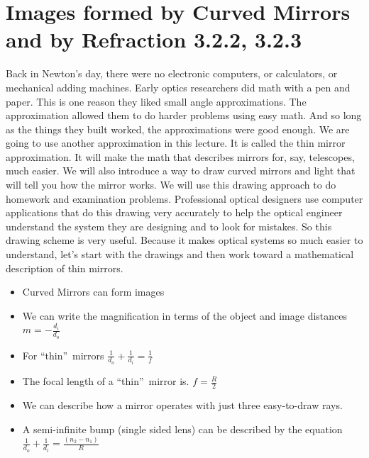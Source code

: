 \documentclass{article}
\begin{document}
\section{Images formed by Curved Mirrors and by Refraction 3.2.2, 3.2.3}

Back in Newton's day, there were no electronic computers, or calculators, or
mechanical adding machines. Early optics researchers did math with a pen and
paper. This is one reason they liked small angle approximations. The
approximation allowed them to do harder problems using easy math. And so
long as the things they built worked, the approximations were good enough.
We are going to use another approximation in this lecture. It is called the
thin mirror approximation. It will make the math that describes mirrors for,
say, telescopes, much easier. We will also introduce a way to draw curved
mirrors and light that will tell you how the mirror works. We will use this
drawing approach to do homework and examination problems. Professional
optical designers use computer applications that do this drawing very
accurately to help the optical engineer understand the system they are
designing and to look for mistakes. So this drawing scheme is very useful.
Because it makes optical systems so much easier to understand, let's start
with the drawings and then work toward a mathematical description of thin
mirrors.

\vspace{0.10in}%

\begin{itemize}
\item Curved Mirrors can form images

\item We can write the magnification in terms of the object and image
distances $m=-\frac{d_{i}}{d_{o}}$

\item For \textquotedblleft thin\textquotedblright\ mirrors $\frac{1}{d_{o}}+%
\frac{1}{d_{i}}=\frac{1}{f}$

\item The focal length of a \textquotedblleft thin\textquotedblright\ mirror
is. $f=\frac{R}{2}$

\item We can describe how a mirror operates with just three easy-to-draw
rays.

\item A semi-infinite bump (single sided lens) can be described by the
equation $\frac{1}{d_{o}}+\frac{1}{d_{i}}=\frac{\left( n_{2}-n_{1}\right) }{R%
}$
\end{itemize}
\end{document}
